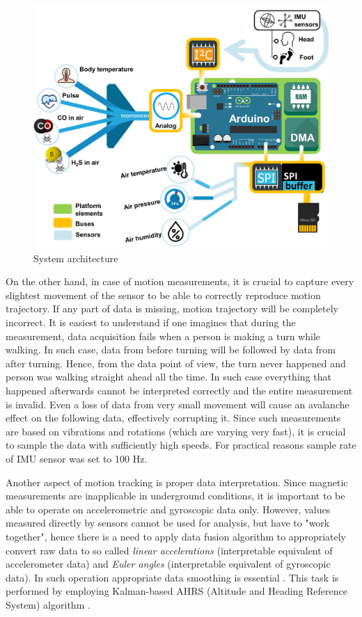 \documentclass[10pt, a4paper]{article}
\begin{document}
\begin{figure}[ht!]
    \centering
    \includegraphics[width=.66\textwidth]{fig/fig3.png}
    \caption{System architecture}
    \label{fig:diagram}
\end{figure}

On the other hand, in case of motion measurements, it is crucial to capture every slightest movement of the sensor to be able to correctly reproduce motion trajectory. If any part of data is missing, motion trajectory will be completely incorrect. It is easiest to understand if one imagines that during the measurement, data acquisition fails when a person is making a turn while walking. In such case, data from before turning will be followed by data from after turning. Hence, from the data point of view, the turn never happened and person was walking straight ahead all the time. In such case everything that happened afterwards cannot be interpreted correctly and the entire measurement is invalid. Even a loss of data from very small movement will cause an avalanche effect on the following data, effectively corrupting it. Since such measurements are based on vibrations and rotations (which are varying very fast), it is crucial to sample the data with sufficiently high speeds. For practical reasons sample rate of IMU sensor was set to 100 Hz.

Another aspect of motion tracking is proper data interpretation. Since magnetic measurements are inapplicable in underground conditions, it is important to be able to operate on accelerometric and gyroscopic data only. However, values measured directly by sensors cannot be used for analysis, but have to "work together", hence there is a need to apply data fusion algorithm to appropriately convert raw data to so called \emph{linear accelerations} (interpretable equivalent of accelerometer data) and \emph{Euler angles} (interpretable equivalent of gyroscopic data). In such operation appropriate data smoothing is essential \cite{wodecki2018review}. This task is performed by employing Kalman-based AHRS (Altitude and Heading Reference System) algorithm \cite{marmion2006airborne}.
\end{document}
